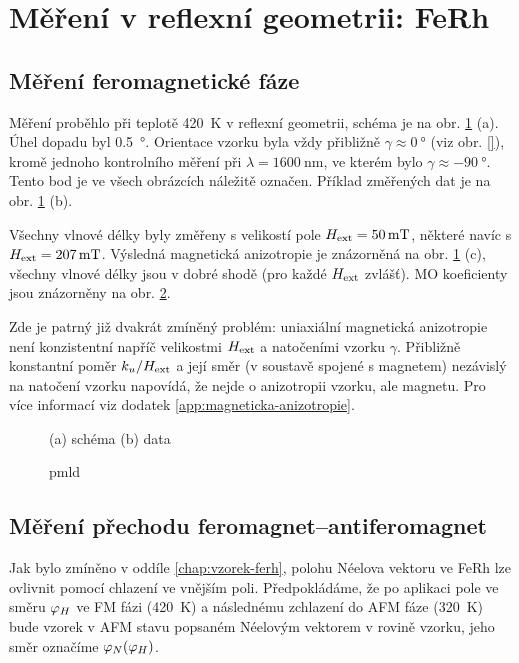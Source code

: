\section{Měření v reflexní geometrii: FeRh}
\label{chap:vysledky-ferh}

\subsection{Měření feromagnetické fáze}
\label{chap:ferh-fm}

Měření proběhlo při teplotě \SI{420}{\kelvin} v reflexní geometrii, schéma je na obr. \ref{fig:ferh-fm-schema-data} (a).
Úhel dopadu byl \SI{0.5}{\degree}.
Orientace vzorku byla vždy přibližně $\gamma\approx\SI{0}{\degree}$ (viz obr. \ref{}), kromě jednoho kontrolního měření při $\lambda=\SI{1600}{\nano\meter}$, ve kterém bylo $\gamma\approx\SI{-90}{\degree}$.
Tento bod je ve všech obrázcích náležitě označen.
Příklad změřených dat je na obr. \ref{fig:ferh-fm-schema-data} (b).

Všechny vlnové délky byly změřeny s velikostí pole $H_\textrm{ext}=\SI{50}{\milli\tesla}$, některé navíc s $H_\textrm{ext}=\SI{207}{\milli\tesla}$.
Výsledná magnetická anizotropie je znázorněná na obr. \ref{fig:ferh-fm-schema-data} (c), všechny vlnové délky jsou v dobré shodě (pro každé $H_\textrm{ext}$ zvlášť).
MO koeficienty jsou znázorněny na obr. \ref{fig:ferh-fm-pmld}.

Zde je patrný již dvakrát zmíněný problém: uniaxiální magnetická anizotropie není konzistentní napříč velikostmi $H_\textrm{ext}$ a natočeními vzorku $\gamma$.
Přibližně konstantní poměr $k_u/H_\textrm{ext}$ a její směr (v soustavě spojené s magnetem) nezávislý na natočení vzorku napovídá, že nejde o anizotropii vzorku, ale magnetu.
Pro více informací viz dodatek \ref{app:magneticka-anizotropie}.

\begin{figure}[htbp]
    \centering
    \missingfigure{}
    \caption{(a) schéma (b) data}
    \label{fig:ferh-fm-schema-data}
\end{figure}

\begin{figure}[htbp]
    \centering
    \missingfigure{}
    \caption{pmld}
    \label{fig:ferh-fm-pmld}
\end{figure}

\subsection{Měření přechodu feromagnet--antiferomagnet}
\label{chap:ferh-field-cooling}

Jak bylo zmíněno v oddíle \ref{chap:vzorek-ferh}, polohu Néelova vektoru ve FeRh lze ovlivnit pomocí chlazení ve vnějším poli.
Předpokládáme, že po aplikaci pole ve směru $\varphi_H$ ve FM fázi (\SI{420}{\kelvin}) a následnému zchlazení do AFM fáze (\SI{320}{\kelvin}) bude vzorek v AFM stavu popsaném Néelovým vektorem v rovině vzorku, jeho směr označíme $\varphi_N(\varphi_H)$.
